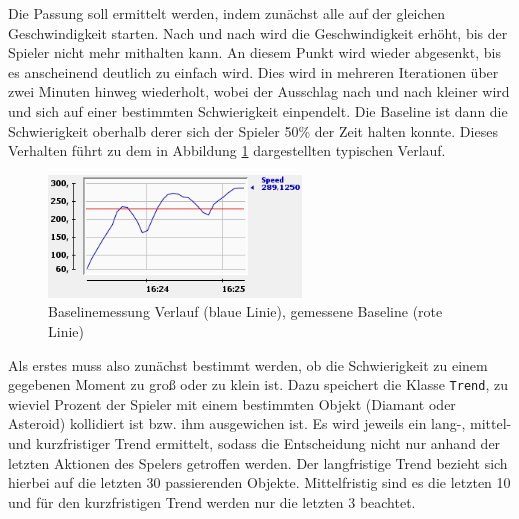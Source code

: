 \documentclass[a4paper,12pt]{scrartcl}
\begin{document}
Die Passung soll ermittelt werden, indem zunächst alle auf der gleichen Geschwindigkeit
starten. Nach und nach wird die Geschwindigkeit erhöht, bis der Spieler nicht mehr mithalten
kann. An diesem Punkt wird wieder abgesenkt, bis es anscheinend deutlich zu einfach
wird. Dies wird in mehreren Iterationen über zwei Minuten hinweg wiederholt, wobei
der Ausschlag nach und nach kleiner wird und sich auf einer bestimmten Schwierigkeit
einpendelt. Die Baseline ist dann die Schwierigkeit oberhalb derer sich der
Spieler 50\% der Zeit halten konnte. Dieses Verhalten führt zu dem in Abbildung \ref{fig:Baseline} dargestellten typischen
Verlauf.

\begin{figure}[htp]
\begin{center}
  \includegraphics[width=0.6\textwidth]{Baseline.png}
  \caption[Baselinemessungsverlauf]{Baselinemessung Verlauf (blaue Linie),
  gemessene Baseline (rote Linie)}
  \label{fig:Baseline}
\end{center}
\end{figure} 

Als erstes muss also zunächst bestimmt werden, ob die Schwierigkeit zu einem gegebenen
Moment zu groß oder zu klein ist. Dazu speichert die Klasse \texttt{Trend}, zu wieviel Prozent der Spieler mit einem bestimmten Objekt (Diamant oder Asteroid) kollidiert ist bzw. ihm ausgewichen ist. Es wird jeweils ein lang-, mittel- und kurzfristiger Trend ermittelt, sodass die Entscheidung nicht nur anhand der letzten Aktionen des Spelers getroffen werden.
Der langfristige Trend bezieht sich hierbei auf die letzten 30 passierenden Objekte.
Mittelfristig sind es die letzten 10 und für den kurzfristigen Trend werden nur die letzten 3 beachtet.
\end{document}
